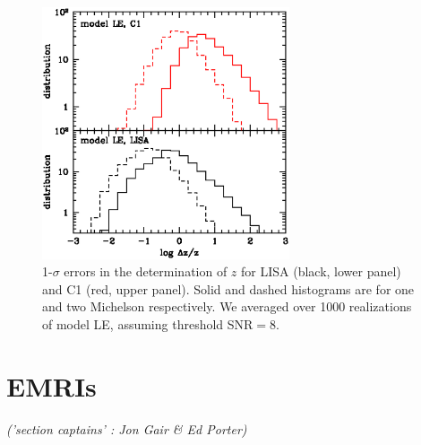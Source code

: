 \documentclass{iopart}
\begin{document}
\begin{figure}[H]
\center
   \includegraphics[width=0.65\textwidth]{FigSMBHModSel/FIG_ERR_Z_81_82.eps} 
\caption{1-$\sigma$ errors in the determination of $z$ for LISA (black, lower panel) and C1 (red, upper panel). Solid and dashed histograms are for one and two Michelson respectively. We averaged over 1000 realizations of model LE, assuming threshold SNR$=8$. 
\label{F:MBHbModel:fig5} } 
\end{figure}






















\section{EMRIs}
{\it ('section captains' : Jon Gair \& Ed Porter) }
\end{document}
